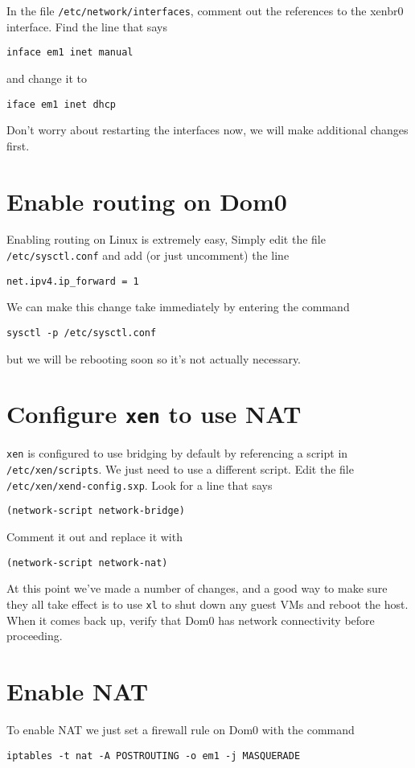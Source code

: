 \documentclass{article}
\begin{document}
In the file \texttt{/etc/network/interfaces}, comment out the references to the xenbr0 interface. Find the line that says

\texttt{inface em1 inet manual} 

and change it to

\texttt{iface em1 inet dhcp}

Don't worry about restarting the interfaces now, we will make additional changes first.

\section{Enable routing on Dom0} 
Enabling routing on Linux is extremely easy, Simply edit the file \texttt{/etc/sysctl.conf} and add (or just 
uncomment) the line

\texttt{net.ipv4.ip\_forward = 1}

We can make this change take immediately by entering the command

\texttt{sysctl -p /etc/sysctl.conf}

but we will be rebooting soon so it's not actually necessary.

\section{Configure \texttt{xen} to use NAT}
\texttt{xen} is configured to use bridging by default by referencing a script in \texttt{/etc/xen/scripts}. We just need to 
use a different script. Edit the file \texttt{/etc/xen/xend-config.sxp}. Look for a line that says 

\texttt{(network-script network-bridge)}

Comment it out and replace it with 

\texttt{(network-script network-nat)}

At this point we've made a number of changes, and a good way to make sure they all take effect is to use \texttt{xl} 
to shut down any guest VMs and reboot the host. When it comes back up, verify that Dom0 has network connectivity 
before proceeding.

\section{Enable NAT}
To enable NAT we just set a firewall rule on Dom0 with the command

\texttt{iptables -t nat -A POSTROUTING -o em1 -j MASQUERADE}
\end{document}
